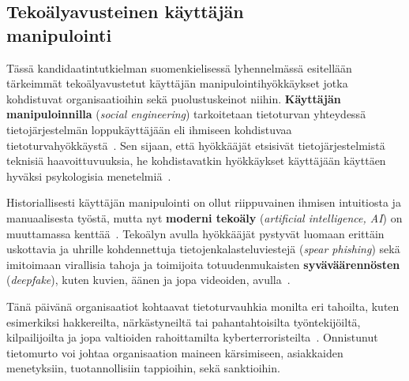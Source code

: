 
\begin{otherlanguage}{finnish}
\chapter*{Tekoälyavusteinen käyttäjän\\manipulointi\label{chapter:finnish}}
\begin{comment}
- erikoismerkkeinä piiloutuva tavutusohje ja sanarajaa luomaton välilyönti
- pitää olla viimeisteltyä kirjakieltä (ei alan slangia: koneiden kaatumisia...)
- taitto on siisti
- marginaaliin valuvat pitkät sanat katkaistaan
- (ali)luvun viimeiset ja ensimmäiset rivit pakotetaan samalle sivulle yhteenkuuluvien kanssa (tai tuomaan mukanaan toinenkin rivi)

\end{comment}


Tässä kandidaatintutkielman suomenkielisessä lyhennelmässä esitellään tärkeimmät tekoälyavustetut käyttäjän manipulointihyökkäykset jotka kohdistuvat organisaatioihin sekä puolustuskeinot niihin. \textbf{Käyttäjän manipuloinnilla} (\textit{social engineering}) tarkoitetaan tietoturvan yhteydessä tietojärjestelmän loppukäyttäjään eli ihmiseen kohdistuvaa tietoturvahyökkäystä~\citep{hatfield_SE_Evolution_Concept_2018}. Sen sijaan, että hyökkääjät etsisivät tietojärjestelmistä teknisiä haavoittuvuuksia, he kohdistavatkin hyökkäykset käyttäjään käyttäen hyväksi psykologisia menetelmiä~\citep{wang_Defining_Social_Engineering_2020}.

Historiallisesti käyttäjän manipulointi on ollut riippuvainen ihmisen intuitiosta ja manuaalisesta työstä, mutta nyt \textbf{moderni tekoäly} (\textit{artificial intelligence, AI}) on muuttamassa kenttää~\citep{blauth_AI_Crime_Overview_Malicious_Use_Abuse_2022, king_AI_Crime_Interdisciplinary_Analysis_2019, mirsky_Threat_Offensive_AI_Organizations_2023}. Tekoälyn avulla hyökkääjät pystyvät luomaan erittäin uskottavia ja uhrille kohdennettuja tietojenkalasteluviestejä (\textit{spear phishing}) sekä imitoimaan virallisia tahoja ja toimijoita totuudenmukaisten \textbf{syväväärennösten} (\textit{deepfake}), kuten kuvien, äänen ja jopa videoiden, avulla~\citep{mirsky_Creation_Detection_Deepfakes_2021}.

Tänä päivänä organisaatiot kohtaavat tietoturvauhkia monilta eri tahoilta, kuten esimerkiksi hakkereilta, närkästyneiltä tai pahantahtoisilta työntekijöiltä, kilpailijoilta ja jopa valtioiden rahoittamilta kyberterroristeilta~\citep{mirsky_Threat_Offensive_AI_Organizations_2023}. Onnistunut tietomurto voi johtaa organisaation maineen kärsimiseen, asiakkaiden menetyksiin, tuotannollisiin tappioihin, sekä sanktioihin.


\end{otherlanguage}

